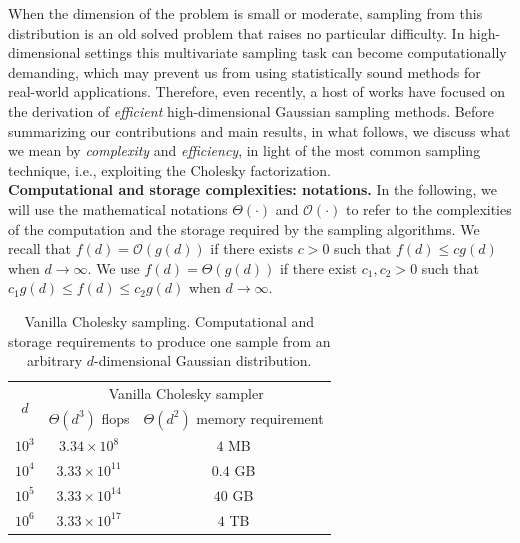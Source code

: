 \documentclass[nohypdvips,onefignum,onetabnum]{siamart171218}
\begin{document}
When the dimension of the problem is small or moderate, sampling from this distribution is an old solved problem that raises no particular difficulty.
In high-dimensional settings this multivariate sampling task can become computationally demanding, which may prevent us from using statistically sound methods for real-world applications.
Therefore, even recently, a host of works have focused on the derivation of \textit{efficient} high-dimensional Gaussian sampling methods. Before summarizing our contributions and main results, in what follows, we discuss what we mean by \emph{complexity} and \emph{efficiency}, in light of the most common sampling technique, i.e., exploiting the Cholesky factorization. \\

\noindent\textbf{Computational and storage complexities: notations.}
In the following, we will use the mathematical notations $\Theta(\cdot)$ and $\mathcal{O}(\cdot)$ to refer to the complexities of the computation and the storage required by the sampling algorithms. We recall that $f(d) = \mathcal{O}(g(d))$ if there exists $c > 0$ such that $f(d) \le c g(d)$ when $d \rightarrow \infty$. We use $f(d) = \Theta(g(d))$ if there exist $c_1,c_2 > 0$ such that $c_1 g(d) \le f(d) \le c_2 g(d)$ when $d \rightarrow \infty$. 

\begin{table}[H]
{\footnotesize
  \caption{Vanilla Cholesky sampling. Computational and storage requirements to produce one sample from an arbitrary $d$-dimensional Gaussian distribution.}
  \label{table:complexity}
  \begin{center}
  {\renewcommand{\arraystretch}{1.5}
      \begin{tabular}{|c|c|c|}
    \hline
    \multirow{2}{*}{$d$} &
      \multicolumn{2}{c|}{Vanilla Cholesky sampler} \\
      \cline{2-3}
    & $\Theta(d^3)$ flops & $\Theta(d^2)$ memory requirement \\
    \hline
    $10^3$ & $3.34 \times 10^8$ & $4$ MB   \\
    $10^4$ & $3.33 \times 10^{11}$ & $0.4$ GB \\
    $10^5$ & $3.33 \times 10^{14}$ & $40$ GB  \\
    $10^6$ & $3.33 \times 10^{17}$ & $4$ TB  \\
    \hline
    \end{tabular}}
  \end{center}
}
\end{table}
%
\end{document}
